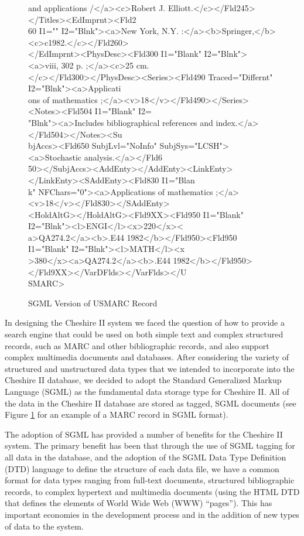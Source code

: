 \begin{figure}[p]
\begin{center}
{{{{\begin{tabbing}
and applications /</a><c>Robert J. Elliott.</c></Fld245></Titles><EdImprnt><Fld2\\
60 I1="" I2="Blnk"><a>New York, N.Y. :</a><b>Springer,</b><c>c1982.</c></Fld260>\\
</EdImprnt><PhysDesc><Fld300 I1="Blank" I2="Blnk"><a>viii, 302 p. ;</a><c>25 cm.\\
</c></Fld300></PhysDesc><Series><Fld490 Traced="Differnt" I2="Blnk"><a>Applicati\\
ons of mathematics ;</a><v>18</v></Fld490></Series><Notes><Fld504 I1="Blank" I2=\\
"Blnk"><a>Includes bibliographical references and index.</a></Fld504></Notes><Su\\
bjAccs><Fld650 SubjLvl="NoInfo" SubjSys="LCSH"><a>Stochastic analysis.</a></Fld6\\
50></SubjAccs><AddEnty></AddEnty><LinkEnty></LinkEnty><SAddEnty><Fld830 I1="Blan\\
k" NFChars="0"><a>Applications of mathematics ;</a><v>18</v></Fld830></SAddEnty>\\
<HoldAltG></HoldAltG><Fld9XX><Fld950 I1="Blank" I2="Blnk"><l>ENGI</l><x>220</x><\\
a>QA274.2</a><b>.E44 1982</b></Fld950><Fld950 I1="Blank" I2="Blnk"><l>MATH</l><x\\
>380</x><a>QA274.2</a><b>.E44 1982</b></Fld950></Fld9XX></VarDFlds></VarFlds></U\\
SMARC>\\
\end{tabbing}
}}
}}
\caption{SGML Version of USMARC Record}
\label{sgmlmarc}
\end{center}
\end{figure}

In designing the Cheshire II system we faced the question of how to
provide a search engine that could be used on both simple text and
complex structured records, such as MARC and other bibliographic
records, and also support complex multimedia documents and
databases. After considering the variety of structured and
unstructured data types that we intended to incorporate into the
Cheshire II database, we decided to adopt the Standard Generalized
Markup Language (SGML)\cite{GOLDFARB} as the fundamental data storage
type for Cheshire II.  All of the data in the Cheshire II database are
stored as tagged, SGML documents (see Figure \ref{sgmlmarc} for an example
of a MARC record in SGML format).

The adoption of SGML has provided a number of benefits for the
Cheshire II system. The primary benefit has been that through the use
of SGML tagging for all data in the database, and the adoption of the
SGML Data Type Definition (DTD) language to define the structure of
each data file, we have a common format for data types ranging from
full-text documents, structured bibliographic records, to complex
hypertext and multimedia documents (using the HTML DTD that defines
the elements of World Wide Web (WWW) ``pages'').  This has important
economies in the development process and in the addition of new
types of data to the system. 

